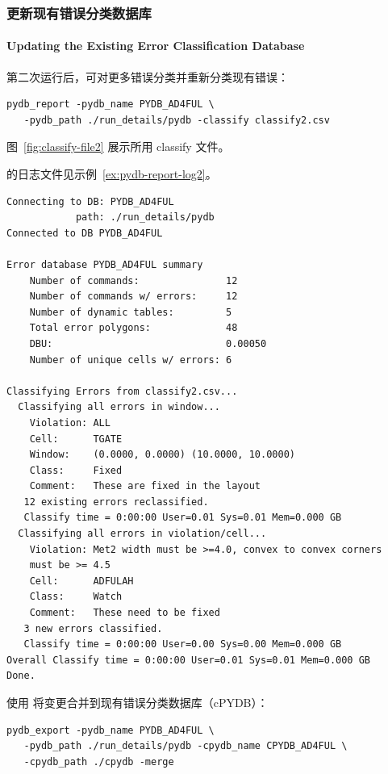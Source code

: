 \subsubsection{更新现有错误分类数据库}
\paragraph*{Updating the Existing Error Classification Database}

第二次运行后，可对更多错误分类并重新分类现有错误：
\begin{lstlisting}[style=shell]
pydb_report -pydb_name PYDB_AD4FUL \
   -pydb_path ./run_details/pydb -classify classify2.csv
\end{lstlisting}

图~\ref{fig:classify-file2} 展示所用 classify 文件。


 的日志文件见示例~\ref{ex:pydb-report-log2}。

\begin{lstlisting}[style=shell,caption={pydb\_report 日志文件},label={ex:pydb-report-log2}]
Connecting to DB: PYDB_AD4FUL
            path: ./run_details/pydb
Connected to DB PYDB_AD4FUL

Error database PYDB_AD4FUL summary
    Number of commands:               12
    Number of commands w/ errors:     12
    Number of dynamic tables:         5
    Total error polygons:             48
    DBU:                              0.00050
    Number of unique cells w/ errors: 6

Classifying Errors from classify2.csv...
  Classifying all errors in window...
    Violation: ALL
    Cell:      TGATE
    Window:    (0.0000, 0.0000) (10.0000, 10.0000)
    Class:     Fixed
    Comment:   These are fixed in the layout
   12 existing errors reclassified.
   Classify time = 0:00:00 User=0.01 Sys=0.01 Mem=0.000 GB
  Classifying all errors in violation/cell...
    Violation: Met2 width must be >=4.0, convex to convex corners
    must be >= 4.5
    Cell:      ADFULAH
    Class:     Watch
    Comment:   These need to be fixed
   3 new errors classified.
   Classify time = 0:00:00 User=0.00 Sys=0.00 Mem=0.000 GB
Overall Classify time = 0:00:00 User=0.01 Sys=0.01 Mem=0.000 GB
Done.
\end{lstlisting}

使用  将变更合并到现有错误分类数据库（cPYDB）：
\begin{lstlisting}[style=shell]
pydb_export -pydb_name PYDB_AD4FUL \
   -pydb_path ./run_details/pydb -cpydb_name CPYDB_AD4FUL \
   -cpydb_path ./cpydb -merge
\end{lstlisting}

